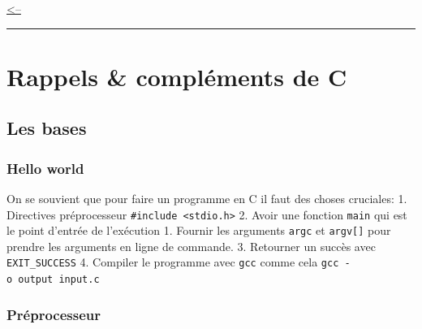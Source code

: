 \href{../README.md}{\textless--}

\begin{center}\rule{0.5\linewidth}{0.5pt}\end{center}

\section{Rappels \& compléments de C}\label{rappels-compluxe9ments-de-c}

\subsection{Les bases}\label{les-bases}

\subsubsection{Hello world}\label{hello-world}

On se souvient que pour faire un programme en C il faut des choses
cruciales: 1. Directives préprocesseur
\texttt{\#include\ \textless{}stdio.h\textgreater{}} 2. Avoir une
fonction \texttt{main} qui est le point d'entrée de l'exécution 1.
Fournir les arguments \texttt{argc} et \texttt{argv{[}{]}} pour prendre
les arguments en ligne de commande. 3. Retourner un succès avec
\texttt{EXIT\_SUCCESS} 4. Compiler le programme avec \texttt{gcc} comme
cela \texttt{gcc\ -o\ output\ input.c}

\begin{Shaded}
\begin{Highlighting}[]

\OperatorTok{(}\OperatorTok{,} \OperatorTok{*}\OperatorTok{[])\{}
\OperatorTok{(}\OperatorTok{);}

    \OperatorTok{;}
\OperatorTok{\}}
\end{Highlighting}
\end{Shaded}

\subsubsection{Préprocesseur}\label{pruxe9processeur}

